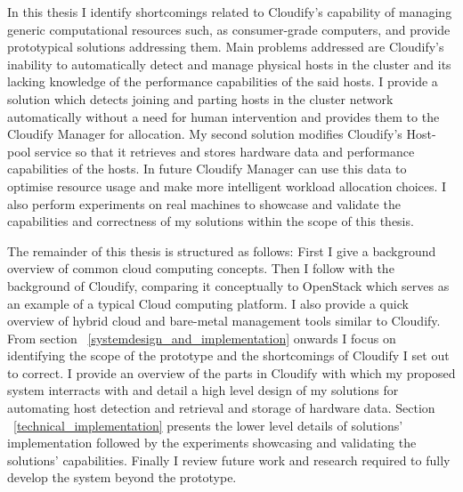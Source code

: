 In this thesis I identify shortcomings related to Cloudify's capability of managing generic computational resources such, as consumer-grade computers, and provide prototypical solutions addressing them. Main problems addressed are Cloudify's inability to automatically detect and manage physical hosts in the cluster and its lacking knowledge of the performance capabilities of the said hosts. I provide a solution which detects joining and parting hosts in the cluster network automatically without a need for human intervention and provides them to the Cloudify Manager for allocation. My second solution modifies Cloudify's Host-pool service so that it retrieves and stores hardware data and performance capabilities of the hosts. In future Cloudify Manager can use this data to optimise resource usage and make more intelligent workload allocation choices. I also perform experiments on real machines to showcase and validate the capabilities and correctness of my solutions within the scope of this thesis.

The remainder of this thesis is structured as follows: First I give a background overview of common cloud computing concepts. Then I follow with the background of Cloudify, comparing it conceptually to OpenStack which serves as an example of a typical Cloud computing platform. I also provide a quick overview of hybrid cloud and bare-metal management tools similar to Cloudify.
From section ~\ref{systemdesign_and_implementation} onwards I focus on identifying the scope of the prototype and the shortcomings of Cloudify I set out to correct. I provide an overview of the parts in Cloudify with which my proposed system interracts with and detail a high level design of my solutions for automating host detection and retrieval and storage of hardware data. Section ~\ref{technical_implementation} presents the lower level details of solutions' implementation followed by the experiments showcasing and validating the solutions' capabilities. Finally I review future work and research required to fully develop the system beyond the prototype.